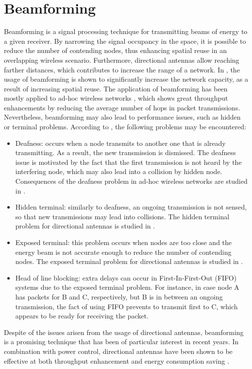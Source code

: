 \documentclass[12pt, a4paper,twoside]{tesi_upf}
\begin{document}
		\section{Beamforming}
		\label{section:beamforming}
			Beamforming \cite{van1988beamforming} is a signal processing technique for transmitting beams of energy to a given receiver. By narrowing the signal occupancy in the space, it is possible to reduce the number of contending nodes, thus enhancing spatial reuse in an overlapping wireless scenario. Furthermore, directional antennas allow reaching farther distances, which contributes to increase the range of a network. In \cite{athan2004antenna}, the usage of beamforming is shown to significantly increase the network capacity, as a result of increasing spatial reuse. The application of beamforming has been mostly applied to ad-hoc wireless networks \cite{ramanathan2001performance, spyropoulos2003capacity, yi2003capacity}, which shows great throughput enhancements by reducing the average number of hops in packet transmissions. Nevertheless, beamforming may also lead to performance issues, such as hidden or terminal problems. According to \cite{alawieh2009improving}, the following problems may be encountered:
			\begin{itemize}
				\item Deafness: occurs when a node transmits to another one that is already transmitting. As a result, the new transmission is dismissed. The deafness issue is motivated by the fact that the first transmission is not heard by the interfering node, which may also lead into a collision by hidden node. Consequences of the deafness problem in ad-hoc wireless networks are studied in \cite{choudhury2005performance}.
				\item Hidden terminal: similarly to deafness, an ongoing transmission is not sensed, so that new transmissions may lead into collisions. The hidden terminal problem for directional antennas is studied in \cite{arora2004directional}. 
				\item Exposed terminal: this problem occurs when nodes are too close and the energy beam is not accurate enough to reduce the number of contending nodes. The exposed terminal problem for directional antennas is studied in \cite{wang2005syn}.
				\item Head of line blocking: extra delays can occur in First-In-First-Out (FIFO) systems due to the exposed terminal problem. For instance, in case node A has packets for B and C, respectively, but B is in between an ongoing transmission, the fact of using FIFO prevents to transmit first to C, which appears to be ready for receiving the packet.
			\end{itemize}
			Despite of the issues arisen from the usage of directional antennas, beamforming is a promising technique that has been of particular interest in recent years. In combination with power control, directional antennas have been shown to be effective at both throughput enhancement and energy consumption saving \cite{fahmy2002ad, nasipuri2002power}.	
		
\end{document}
